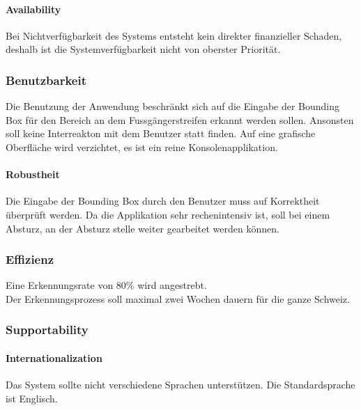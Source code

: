 \paragraph{Availability}
Bei Nichtverfügbarkeit des Systems entsteht kein direkter finanzieller Schaden, deshalb ist die Systemverfügbarkeit nicht von oberster Priorität. 
\subsubsection{Benutzbarkeit}
Die Benutzung der Anwendung beschränkt sich auf die Eingabe der Bounding Box für den Bereich an dem Fussgängerstreifen erkannt werden sollen. Ansonsten soll keine Interreakton mit dem Benutzer statt finden. Auf eine grafische Oberfläche wird verzichtet, es ist ein reine Konsolenapplikation.

\paragraph{Robustheit}
Die Eingabe der Bounding Box durch den Benutzer muss auf Korrektheit überprüft werden. Da die Applikation sehr rechenintensiv ist, soll bei einem Absturz, an der Absturz stelle weiter gearbeitet werden können.
\subsubsection{Effizienz}
Eine Erkennungsrate von 80\% wird angestrebt.\\
Der Erkennungsprozess soll maximal zwei Wochen dauern für die ganze Schweiz.

\subsubsection{Supportability}
\paragraph{Internationalization}
Das System sollte nicht verschiedene Sprachen unterstützen. 
Die Standardsprache ist Englisch.


